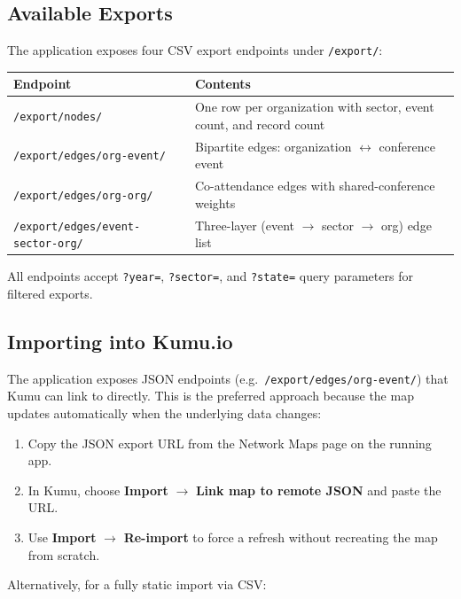 \documentclass[12pt]{article}
\begin{document}
\subsection{Available Exports}

The application exposes four CSV export endpoints under \texttt{/export/}:

\begin{center}
\begin{tabular}{lp{8cm}}
\toprule
Endpoint & Contents \\
\midrule
\texttt{/export/nodes/} & One row per organization with sector, event count, and record count \\
\texttt{/export/edges/org-event/} & Bipartite edges: organization $\leftrightarrow$ conference event \\
\texttt{/export/edges/org-org/} & Co-attendance edges with shared-conference weights \\
\texttt{/export/edges/event-sector-org/} & Three-layer (event $\to$ sector $\to$ org) edge list \\
\bottomrule
\end{tabular}
\end{center}

All endpoints accept \texttt{?year=}, \texttt{?sector=}, and
\texttt{?state=} query parameters for filtered exports.

\subsection{Importing into Kumu.io}

The application exposes JSON endpoints (e.g.\ \texttt{/export/edges/org-event/})
that Kumu can link to directly. This is the preferred approach because the
map updates automatically when the underlying data changes:

\begin{enumerate}[leftmargin=1.5em]
  \item Copy the JSON export URL from the Network Maps page on the running app.
  \item In Kumu, choose \textbf{Import} $\to$ \textbf{Link map to remote JSON}
        and paste the URL.
  \item Use \textbf{Import} $\to$ \textbf{Re-import} to force a refresh without
        recreating the map from scratch.
\end{enumerate}

Alternatively, for a fully static import via CSV:
\end{document}
